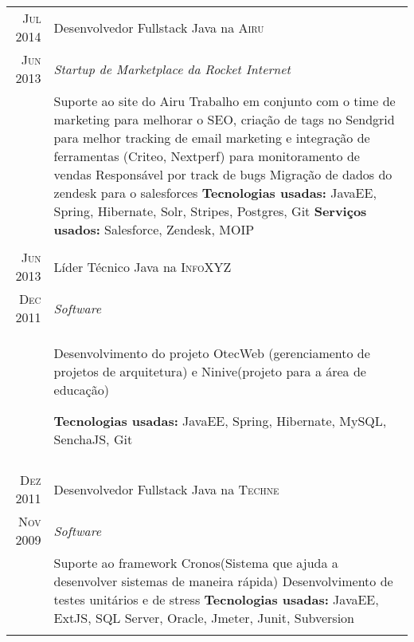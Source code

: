 \documentclass[a4paper,10pt]{article}
\begin{document}
\begin{tabular}{r|p{11cm}}





 \textsc{Jul 2014} & Desenvolvedor Fullstack Java na \textsc{Airu} \\\textsc{Jun 2013}&\emph{Startup de Marketplace da Rocket Internet }\\&\footnotesize{ Suporte ao site do Airu\newline
    Trabalho em conjunto com o time de marketing para melhorar o SEO, criação de tags no Sendgrid para melhor tracking de email marketing e integração de ferramentas (Criteo, Nextperf) para monitoramento de vendas\newline
    Responsável por track de bugs\newline
    Migração de dados do zendesk para o salesforces\newline
\textbf{Tecnologias usadas:} JavaEE, Spring, Hibernate, Solr, Stripes, Postgres, Git\newline
\textbf{Serviços usados:} Salesforce, Zendesk, MOIP 
 }\\\multicolumn{2}{c}{} \\


\textsc{Jun 2013} & Líder Técnico Java na \textsc{InfoXYZ} \\\textsc{Dec 2011}&\emph{Software}\\&\footnotesize{  Desenvolvimento do projeto OtecWeb (gerenciamento de projetos de arquitetura) e Ninive(projeto para a área de educação)\newline

\textbf{Tecnologias usadas:} JavaEE, Spring, Hibernate, MySQL, SenchaJS, Git
 }\\\multicolumn{2}{c}{} \\

\textsc{Dez 2011} & Desenvolvedor Fullstack Java na \textsc{Techne} \\\textsc{Nov 2009}&\emph{Software}\\&\footnotesize{ Suporte ao framework Cronos(Sistema que ajuda a desenvolver sistemas de maneira rápida)\newline
                          Desenvolvimento de testes unitários e de stress \newline
\textbf{Tecnologias usadas:} JavaEE, ExtJS, SQL Server, Oracle, Jmeter, Junit, Subversion
 }\\\multicolumn{2}{c}{} \\


\end{tabular}
\end{document}
